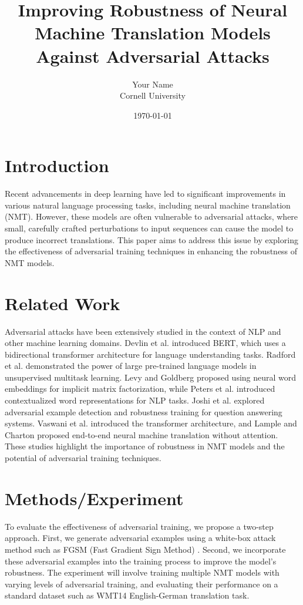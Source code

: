 \documentclass{article}
\title{Improving Robustness of Neural Machine Translation Models Against Adversarial Attacks}
\author{Your Name \\ Cornell University}
\date{\today}
\begin{document}
\maketitle

\section{Introduction}
Recent advancements in deep learning have led to significant improvements in various natural language processing tasks, including neural machine translation (NMT). However, these models are often vulnerable to adversarial attacks, where small, carefully crafted perturbations to input sequences can cause the model to produce incorrect translations. This paper aims to address this issue by exploring the effectiveness of adversarial training techniques in enhancing the robustness of NMT models.

\section{Related Work}
Adversarial attacks have been extensively studied in the context of NLP and other machine learning domains. Devlin et al. \cite{devlin2019bert} introduced BERT, which uses a bidirectional transformer architecture for language understanding tasks. Radford et al. \cite{radford2019language} demonstrated the power of large pre-trained language models in unsupervised multitask learning. Levy and Goldberg \cite{levy2014neural} proposed using neural word embeddings for implicit matrix factorization, while Peters et al. \cite{peters2018deep} introduced contextualized word representations for NLP tasks. Joshi et al. \cite{joshi2017adversarial} explored adversarial example detection and robustness training for question answering systems. Vaswani et al. \cite{vaswani2017attention} introduced the transformer architecture, and Lample and Charton \cite{lample2019end} proposed end-to-end neural machine translation without attention. These studies highlight the importance of robustness in NMT models and the potential of adversarial training techniques.

\section{Methods/Experiment}
To evaluate the effectiveness of adversarial training, we propose a two-step approach. First, we generate adversarial examples using a white-box attack method such as FGSM (Fast Gradient Sign Method) \cite{goodfellow2014explaining}. Second, we incorporate these adversarial examples into the training process to improve the model's robustness. The experiment will involve training multiple NMT models with varying levels of adversarial training, and evaluating their performance on a standard dataset such as WMT14 English-German translation task.
\end{document}
